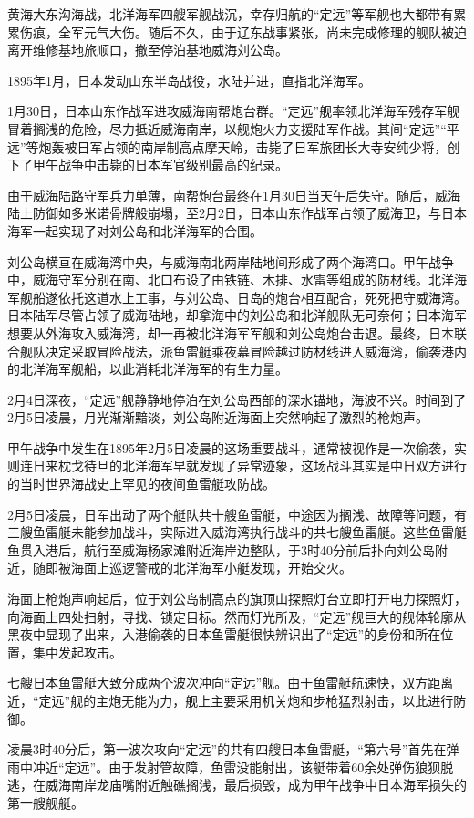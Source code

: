 \documentclass[12pt,UTF8]{ctexbook}
\begin{document}
黄海大东沟海战，北洋海军四艘军舰战沉，幸存归航的“定远”等军舰也大都带有累累伤痕，全军元气大伤。随后不久，由于辽东战事紧张，尚未完成修理的舰队被迫离开维修基地旅顺口，撤至停泊基地威海刘公岛。

1895年1月，日本发动山东半岛战役，水陆并进，直指北洋海军。

1月30日，日本山东作战军进攻威海南帮炮台群。“定远”舰率领北洋海军残存军舰冒着搁浅的危险，尽力抵近威海南岸，以舰炮火力支援陆军作战。其间“定远”“平远”等炮轰被日军占领的南岸制高点摩天岭，击毙了日军旅团长大寺安纯少将，创下了甲午战争中击毙的日本军官级别最高的纪录。

由于威海陆路守军兵力单薄，南帮炮台最终在1月30日当天午后失守。随后，威海陆上防御如多米诺骨牌般崩塌，至2月2日，日本山东作战军占领了威海卫，与日本海军一起实现了对刘公岛和北洋海军的合围。

刘公岛横亘在威海湾中央，与威海南北两岸陆地间形成了两个海湾口。甲午战争中，威海守军分别在南、北口布设了由铁链、木排、水雷等组成的防材线。北洋海军舰船遂依托这道水上工事，与刘公岛、日岛的炮台相互配合，死死把守威海湾。日本陆军尽管占领了威海陆地，却拿海中的刘公岛和北洋舰队无可奈何；日本海军想要从外海攻入威海湾，却一再被北洋海军军舰和刘公岛炮台击退。最终，日本联合舰队决定采取冒险战法，派鱼雷艇乘夜幕冒险越过防材线进入威海湾，偷袭港内的北洋海军舰船，以此消耗北洋海军的有生力量。

2月4日深夜，“定远”舰静静地停泊在刘公岛西部的深水锚地，海波不兴。时间到了2月5日凌晨，月光渐渐黯淡，刘公岛附近海面上突然响起了激烈的枪炮声。

甲午战争中发生在1895年2月5日凌晨的这场重要战斗，通常被视作是一次偷袭，实则连日来枕戈待旦的北洋海军早就发现了异常迹象，这场战斗其实是中日双方进行的当时世界海战史上罕见的夜间鱼雷艇攻防战。

2月5日凌晨，日军出动了两个艇队共十艘鱼雷艇，中途因为搁浅、故障等问题，有三艘鱼雷艇未能参加战斗，实际进入威海湾执行战斗的共七艘鱼雷艇。这些鱼雷艇鱼贯入港后，航行至威海杨家滩附近海岸边整队，于3时40分前后扑向刘公岛附近，随即被海面上巡逻警戒的北洋海军小艇发现，开始交火。

海面上枪炮声响起后，位于刘公岛制高点的旗顶山探照灯台立即打开电力探照灯，向海面上四处扫射，寻找、锁定目标。然而灯光所及，“定远”舰巨大的舰体轮廓从黑夜中显现了出来，入港偷袭的日本鱼雷艇很快辨识出了“定远”的身份和所在位置，集中发起攻击。

七艘日本鱼雷艇大致分成两个波次冲向“定远”舰。由于鱼雷艇航速快，双方距离近，“定远”舰的主炮无能为力，舰上主要采用机关炮和步枪猛烈射击，以此进行防御。

凌晨3时40分后，第一波次攻向“定远”的共有四艘日本鱼雷艇，“第六号”首先在弹雨中冲近“定远”。由于发射管故障，鱼雷没能射出，该艇带着60余处弹伤狼狈脱逃，在威海南岸龙庙嘴附近触礁搁浅，最后损毁，成为甲午战争中日本海军损失的第一艘舰艇。
\end{document}
